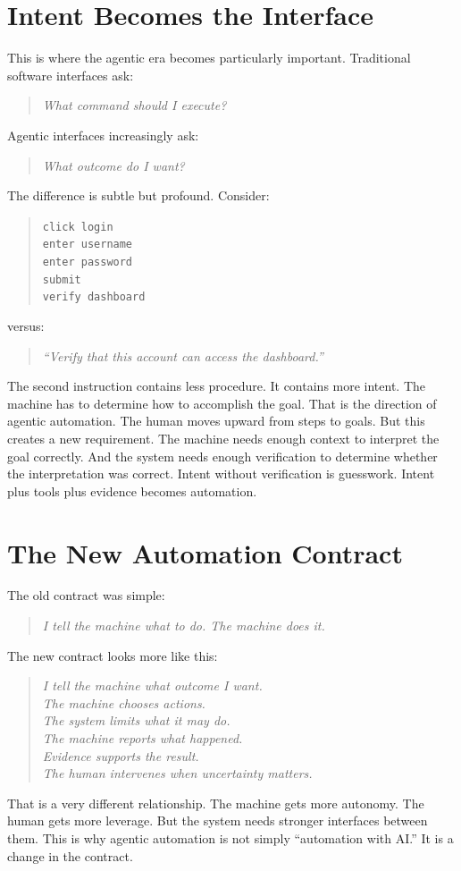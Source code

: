 \documentclass[11pt,twoside]{book}
\begin{document}
\section*{Intent Becomes the Interface}

This is where the agentic era becomes particularly important.
Traditional software interfaces ask:
\begin{quote}
\emph{What command should I execute?}
\end{quote}
Agentic interfaces increasingly ask:
\begin{quote}
\emph{What outcome do I want?}
\end{quote}
The difference is subtle but profound.
Consider:
\begin{quote}
\texttt{click login}\\
\texttt{enter username}\\
\texttt{enter password}\\
\texttt{submit}\\
\texttt{verify dashboard}
\end{quote}
versus:
\begin{quote}
\emph{``Verify that this account can access the dashboard.''}
\end{quote}
The second instruction contains less procedure.
It contains more intent.
The machine has to determine how to accomplish the goal.
That is the direction of agentic automation.
The human moves upward from steps to goals.
But this creates a new requirement.
The machine needs enough context to interpret the goal correctly.
And the system needs enough verification to determine whether the interpretation was correct.
Intent without verification is guesswork.
Intent plus tools plus evidence becomes automation.

\section*{The New Automation Contract}

The old contract was simple:
\begin{quote}
\emph{I tell the machine what to do. The machine does it.}
\end{quote}
The new contract looks more like this:
\begin{quote}
\emph{I tell the machine what outcome I want.\\
The machine chooses actions.\\
The system limits what it may do.\\
The machine reports what happened.\\
Evidence supports the result.\\
The human intervenes when uncertainty matters.}
\end{quote}
That is a very different relationship.
The machine gets more autonomy.
The human gets more leverage.
But the system needs stronger interfaces between them.
This is why agentic automation is not simply ``automation with AI.''
It is a change in the contract.
\end{document}
